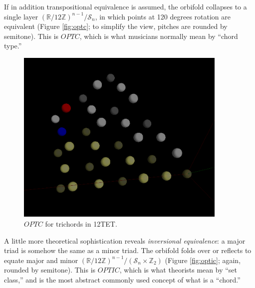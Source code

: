 \documentclass[english,11pt,letterpaper,onecolumn]{scrartcl}
\numberwithin{equation}{section}
\begin{document}
    If in addition transpositional equivalence is assumed, the orbifold collapses 
    to a single layer $\left(\mathbb{R}/12\mathbb{Z}\right)^{n-1}/\mathcal{S}_{n}$, 
    in which points at 120 degrees rotation are equivalent (Figure \ref{fig:optc}; 
    to simplify the view, pitches are rounded by semitone). This is $OPTC$, which 
    is what musicians normally mean by ``chord type.''
    
    \begin{figure}
        \centerline{\includegraphics[width = 0.9\textwidth]{opttc}}
        \caption{\label{fig:opttc} 
            $OPTC$ for trichords in 12TET.}
    \end{figure}
    
    A little more theoretical sophistication reveals \textit{inversional 
        equivalence}: a major triad is somehow the same as a minor triad. The 
    orbifold folds over or reflects to equate major and minor 
    $\left(\mathbb{R}/12\mathbb{Z}\right)^{n-1}/(\mathcal{S}_{n} \times 
    \mathbb{Z}_{2})$ (Figure \ref{fig:optic}; again, rounded by semitone). This is 
    $OPTIC$, which is what theorists mean by ``set class,'' and is the most 
    abstract commonly used concept of what is a ``chord.''
    
\end{document}
